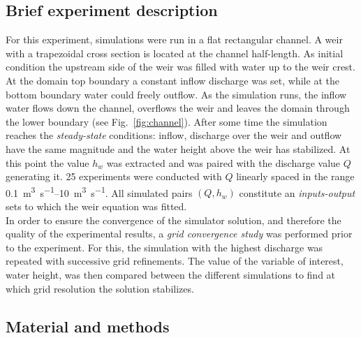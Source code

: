 \subsection{Brief experiment description}\label{sec:cs1_brief_description}

For this experiment, simulations were run in a flat rectangular channel.
A weir with a trapezoidal cross section is located at the channel half-length.
As initial condition the upstream side of the weir was filled with water up to the weir crest.
At the domain top boundary a constant inflow discharge was set, while at the bottom boundary water could freely outflow.
As the simulation runs, the inflow water flows down the channel, overflows the weir and leaves the domain through the lower boundary (see Fig.~\ref{fig:channel}).
After some time the simulation reaches the \emph{steady-state} conditions: inflow, discharge over the weir and outflow have the same magnitude and the water height above the weir has stabilized.
At this point the value $h_w$ was extracted and was paired with the discharge value $Q$ generating it.
\num{25} experiments were conducted with $Q$ linearly spaced in the range \SIrange{0.1}{10}{\cubic\meter\per\second}.
All simulated pairs $(Q, h_w)$ constitute an \emph{inputs-output} sets to which the weir equation was fitted.\\

In order to ensure the convergence of the simulator solution, and therefore the quality of the experimental results, a \emph{grid convergence study} was performed prior to the experiment.
For this, the simulation with the highest discharge was repeated with successive grid refinements.
The value of the variable of interest, water height, was then compared between the different simulations to find at which grid resolution the solution stabilizes.


\subsection{Material and methods}
